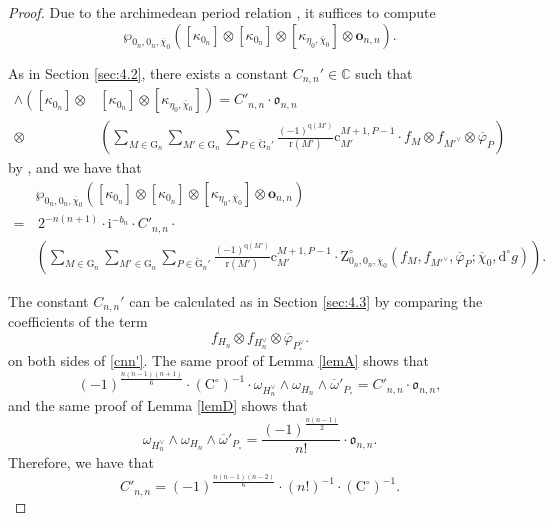\documentclass[12pt, a4paper]{amsart}
\newcommand{\RC}{{\mathrm {C}}}
\newcommand{\RG}{{\mathrm {G}}}
\newcommand{\RZ}{{\mathrm {Z}}}
\newcommand{\C}{\mathbb{C}}
\theoremstyle{Theorem}
\theoremstyle{Theorem}
\theoremstyle{Theorem}
\theoremstyle{Theorem}
\theoremstyle{Plain}
\theoremstyle{Definition}
\begin{document}
	
	
	
	\begin{proof}
		Due to the archimedean period relation \cite[Theorem 1.6]{JLSa}, it suffices to compute
		\[
		\wp_{0_n,0_n,\overline{\chi}_0}\left([\kappa_{0_n}]\otimes[\kappa_{0_n}]\otimes[\kappa_{\eta_0,\overline{\chi}_0}]\otimes\mathbf{o}_{n,n}\right).
		\]
		
		As in Section \ref{sec:4.2}, there exists a constant $C_{n,n}'\in\C$ such that 
		\begin{equation}\label{cnn'}
			\begin{aligned}
				\wedge\left([\kappa_{0_n}]\otimes\right.&\left.[\kappa_{0_n}]\otimes[\kappa_{\eta_0,\overline{\chi}_0}]\right)=C'_{n,n}\cdot\mathfrak{o}_{n,n}\\
				\otimes&\left(\sum_{M\in\RG_n}\sum_{M'\in\RG_n}\sum_{P\in\check{\RG}_n'}\frac{(-1)^{\mathrm{q}(M')}}{\mathrm{r}(M')}\mathrm{c}_{M'}^{M+1,P-1}\cdot f_M\otimes f_{M'^{\vee}}\otimes\overline{\varphi}_{P}\right)
			\end{aligned}
		\end{equation}
		by \cite[Lemma 4.3]{IM}, and we have that
		\[
		\begin{aligned}
			&\wp_{0_n,0_n,\overline{\chi}_0}\left([\kappa_{0_n}]\otimes[\kappa_{0_n}]\otimes[\kappa_{\eta_0,\overline{\chi}_0}]\otimes\mathbf{o}_{n,n}\right)\\
			=&\,2^{-n(n+1)}\cdot\mathrm{i}^{-b_n}\cdot C'_{n,n}\cdot\\
			&\left(\sum_{M\in\RG_n}\sum_{M'\in\RG_n}\sum_{P\in\check{\RG}_n'}\frac{(-1)^{\mathrm{q}(M')}}{\mathrm{r}(M')}\mathrm{c}_{M'}^{M+1,P-1}\cdot\RZ^{\circ}_{0_n,0_n,\overline{\chi}_0}\left(f_M,f_{M'^{\vee}},\overline{\varphi}_P;\overline{\chi}_0,\mathrm{d}^{\circ}g\right)\right).
		\end{aligned}
		\]
		
		The constant $C_{n,n}'$ can be calculated as in Section \ref{sec:4.3} by comparing the coefficients of the term
		\[
		f_{H_n}\otimes f_{H^{\vee}_n}\otimes\overline{\varphi}_{P^{\vee}_{\circ}}.
		\]
		on both sides of \eqref{cnn'}. The same proof of Lemma \ref{lemA} shows that
		\[
		(-1)^{\frac{n(n-1)(n+1)}{6}}\cdot(\RC^{\circ})^{-1}\cdot	\omega_{H^{\vee}_n}\wedge\omega_{H_n}\wedge\overline{\omega}'_{P_{\circ}}=C'_{n,n}\cdot\mathfrak{o}_{n,n},
		\]
		and the same proof of Lemma \ref{lemD} shows that
		\[
		\omega_{H^{\vee}_n}\wedge\omega_{H_n}\wedge\overline{\omega}'_{P_{\circ}}=\frac{(-1)^{\frac{n(n-1)}{2}}}{n!}\cdot\mathfrak{o}_{n,n}.
		\]
		Therefore, we have that
		\[
		C'_{n,n}=(-1)^{\frac{n(n-1)(n-2)}{6}}\cdot(n!)^{-1}\cdot(\RC^{\circ})^{-1}.
		\]
		

\end{proof}
\end{document}
